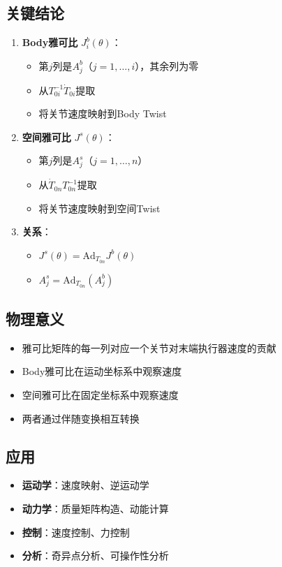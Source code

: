 \documentclass[12pt,a4paper]{article}
\begin{document}
\subsection{关键结论}

\begin{enumerate}
\item \textbf{Body雅可比} $J_i^b(\theta)$：
\begin{itemize}
\item 第$j$列是$A_j^b$（$j = 1, \ldots, i$），其余列为零
\item 从$T_{0i}^{-1}\dot{T}_{0i}$提取
\item 将关节速度映射到Body Twist
\end{itemize}

\item \textbf{空间雅可比} $J^s(\theta)$：
\begin{itemize}
\item 第$j$列是$A_j^s$（$j = 1, \ldots, n$）
\item 从$\dot{T}_{0n} T_{0n}^{-1}$提取
\item 将关节速度映射到空间Twist
\end{itemize}

\item \textbf{关系}：
\begin{itemize}
\item $J^s(\theta) = \text{Ad}_{T_{0n}} J^b(\theta)$
\item $A_j^s = \text{Ad}_{T_{0n}}(A_j^b)$
\end{itemize}
\end{enumerate}

\subsection{物理意义}

\begin{itemize}
\item 雅可比矩阵的每一列对应一个关节对末端执行器速度的贡献
\item Body雅可比在运动坐标系中观察速度
\item 空间雅可比在固定坐标系中观察速度
\item 两者通过伴随变换相互转换
\end{itemize}

\subsection{应用}

\begin{itemize}
\item \textbf{运动学}：速度映射、逆运动学
\item \textbf{动力学}：质量矩阵构造、动能计算
\item \textbf{控制}：速度控制、力控制
\item \textbf{分析}：奇异点分析、可操作性分析
\end{itemize}
\end{document}
